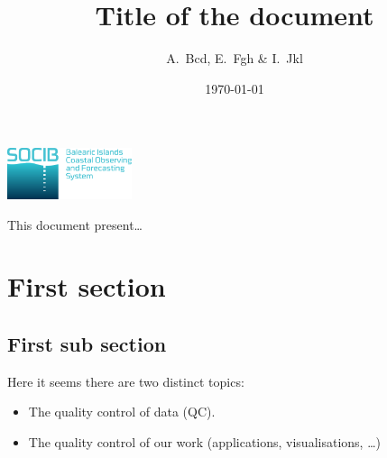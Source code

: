 \documentclass[12pt,svgnames,final]{article}
\title{Title of the document}
\author{A.~Bcd, E.~Fgh \& I.~Jkl}
\date{\today}
\begin{document}
\begin{titlepage}

\centering

\vspace*{3.5cm}

{\Huge \thetitle}

\vspace{1cm}

\includegraphics[height=1.5cm]{logo_socib.eps}

\vspace{1cm}

\theauthor

\vspace{1cm}
{\normalsize \thedate}

\end{titlepage}

This document present\ldots

\tableofcontents

\newpage

\pagestyle{fancy}

\section{First section}

\subsection{First sub section}

Here it seems there are two distinct topics:
\begin{itemize}
\item The quality control of data (QC). 
\item The quality control of our work (applications, visualisations, \ldots)
\end{itemize}
\end{document}
